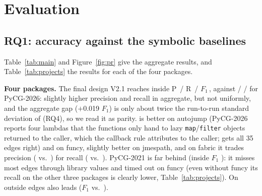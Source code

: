 \section{Evaluation}
\label{sec:eval}



\begin{table}[t]
  \caption{Accuracy of every tool (official scorer, raw names). Inside: edges
  whose callee is in the analysed package (the headline); outside: edges to
  builtins, the standard library and other packages; exact: micro cases whose
  graph equals the ground truth. Bold: best single tool in a column. All \nscg
  variants use Haiku~5.5; Sonnet rows are discussed in RQ2. PyCG-2021 timed out
  on funcy (all its edges count as missed).}
  \label{tab:main}
  \small
  \setlength{\tabcolsep}{3.6pt}
  
\end{table}

\subsection{RQ1: accuracy against the symbolic baselines}
\label{sec:rq1}

Table~\ref{tab:main} and Figure~\ref{fig:pr} give the aggregate results, and
Table~\ref{tab:projects} the results for each of the four packages.

\textbf{Four packages.} The final design V2.1 reaches inside
P\, / R\, /
\textbf{$F_1$\,}, against  /
 /  for PyCG-2026: slightly
higher precision and recall in aggregate, but not uniformly, and the
aggregate gap ($+$0.019 $F_1$) is only about twice the run-to-run standard deviation of
\nscg (RQ4), so we read it as parity. \nscg is better on autojump
(PyCG-2026 reports four lambdas that the functions only hand to lazy
\texttt{map}/\texttt{filter} objects returned to the caller, which the
callback rule attributes to the caller; \nscg gets all 35 edges right) and on
funcy, slightly better on jmespath, and on fabric it trades precision
( vs.\ ) for recall
( vs.\ ). PyCG-2021 is far
behind (inside $F_1$ ): it misses most edges through
library values and timed out on funcy (even without funcy its recall on the other
three packages is clearly lower, Table~\ref{tab:projects}). On outside edges \nscg also leads
($F_1$  vs.\ ).

